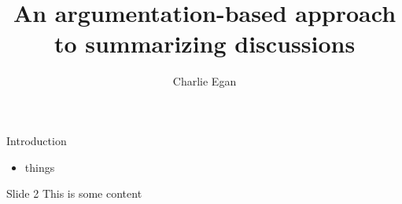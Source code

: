 \documentclass{beamer}
\title{An argumentation-based approach to summarizing discussions}
\date{}
\author{Charlie Egan}
\institute{University of Aberdeen}
\begin{document}
  \maketitle
  \begin{frame}{Introduction}
    \begin{itemize}
      \item{things}
	\end{itemize}
  \end{frame}

  \begin{frame}{Slide 2}
    This is some content
  \end{frame}
\end{document}
